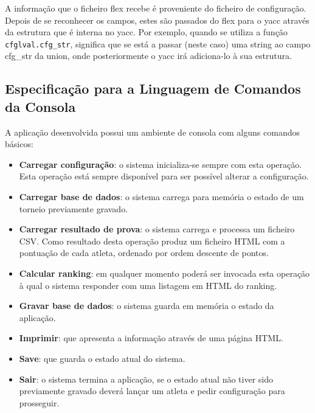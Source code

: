 \documentclass[11pt, a4paper, oneside]{article}
\begin{document}
A informação que o ficheiro \textsf{flex} recebe é proveniente do ficheiro de configuração.
Depois de se reconhecer os campos, estes são passados do \textsf{flex} para o \textsf{yacc} através da estrutura que é interna no \textsf{yacc}.
Por exemplo, quando se utiliza a função \texttt{cfglval.cfg\_str}, significa que se está a passar (neste caso) uma string ao campo cfg\_str da union, onde posteriormente o \textsf{yacc} irá adiciona-lo à sua estrutura.
\newpage

\subsection{Especificação para a Linguagem de Comandos da Consola}
A aplicação desenvolvida possui um ambiente de consola com alguns comandos básicos:
\begin{itemize}
\item \textbf{Carregar configuração}: o sistema inicializa-se sempre com esta operação. Esta operação está sempre disponível para ser possível alterar a configuração.
\item \textbf{Carregar base de dados}: o sistema carrega para memória o estado de um torneio previamente gravado.
\item \textbf{Carregar resultado de prova}: o sistema carrega e processa um ficheiro CSV. Como resultado desta operação produz um ficheiro \textsf{HTML} com a pontuação de cada atleta, ordenado por ordem descente de pontos.
\item \textbf{Calcular ranking}: em qualquer momento poderá ser invocada esta operação à qual o sistema responder com uma listagem em \textsf{HTML} do ranking.
\item \textbf{Gravar base de dados}: o sistema guarda em memória o estado da aplicação.
\item \textbf{Imprimir}: que apresenta a informação através de uma página \textsf{HTML}.
\item \textbf{Save}: que guarda o estado atual do sistema.
\item \textbf{Sair}: o sistema termina a aplicação, se o estado atual não tiver sido previamente gravado deverá lançar um atleta e pedir configuração para prosseguir.
\end{itemize}
\newpage
\end{document}

